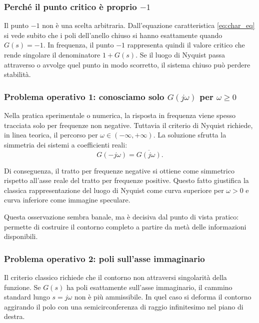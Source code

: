 \documentclass[11pt,a4paper]{article}
\begin{document}
\subsubsection{Perché il punto critico è proprio \texorpdfstring{$-1$}{-1}}

Il punto $-1$ non è una scelta arbitraria. Dall’equazione caratteristica \eqref{eq:char_eq} si vede subito che i poli dell’anello chiuso si hanno esattamente quando $G(s)=-1$. In frequenza, il punto $-1$ rappresenta quindi il valore critico che rende singolare il denominatore $1+G(s)$. Se il luogo di Nyquist passa attraverso o avvolge quel punto in modo scorretto, il sistema chiuso può perdere stabilità.

\subsubsection{Problema operativo 1: conosciamo solo \texorpdfstring{$G(j\omega)$ per $\omega\ge 0$}{G(jw) per w>=0}}

Nella pratica sperimentale o numerica, la risposta in frequenza viene spesso tracciata solo per frequenze non negative. Tuttavia il criterio di Nyquist richiede, in linea teorica, il percorso per $\omega \in (-\infty,+\infty)$. La soluzione sfrutta la simmetria dei sistemi a coefficienti reali:
$$
G(-j\omega) = \overline{G(j\omega)}.
$$

Di conseguenza, il tratto per frequenze negative si ottiene come simmetrico rispetto all’asse reale del tratto per frequenze positive. Questo fatto giustifica la classica rappresentazione del luogo di Nyquist come curva superiore per $\omega>0$ e curva inferiore come immagine speculare.

Questa osservazione sembra banale, ma è decisiva dal punto di vista pratico: permette di costruire il contorno completo a partire da metà delle informazioni disponibili.

\subsubsection{Problema operativo 2: poli sull’asse immaginario}
\label{sec:imagaxis}

Il criterio classico richiede che il contorno non attraversi singolarità della funzione. Se $G(s)$ ha poli esattamente sull’asse immaginario, il cammino standard lungo $s=j\omega$ non è più ammissibile. In quel caso si deforma il contorno aggirando il polo con una semicirconferenza di raggio infinitesimo nel piano di destra.
\end{document}
